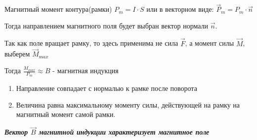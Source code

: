 \documentclass[../main.tex]{subfiles}
\begin{document}
 Магнитный момент контура(рамки) $P_m = I \cdot S$ или в векторном виде: $\vec P_m = P_m \cdot \vec n$

Тогда направлением магнитного поля будет выбран вектор нормали $\vec n$.


Так как поле вращает рамку, то здесь применима не сила $\vec F$, а момент силы $\vec M$, выберем $\vec M_{max}$

\vspace{4px}

Тогда $\frac{M_{max}}{P_m} \approx B$ - магнитная индукция

\begin{enumerate}
    \item Направление совпадает с нормалью к рамке после поворота
    \item Величина равна максимальному моменту силы, действующей на рамку на магнитный момент самой рамки. 
\end{enumerate}

\textbf{\textit{Вектор $\vec B$ магнитной индукции характеризует магнитное поле}}
\end{document}
